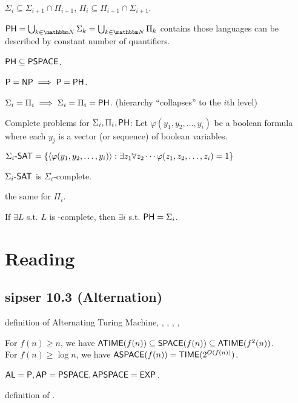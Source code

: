 \documentclass{article}
\begin{document}
\begin{observation}
  \(\Sigma_i \subseteq \Sigma_{i+1} \cap \Pi_{i+1}\), \(\Pi_i \subseteq \Pi_{i+1} \cap \Sigma_{i+1}\).
\end{observation}

\begin{definition}
  \(\PH = \bigcup_{k \in \N} \Sigma_k = \bigcup_{k \in \N} \Pi_k\) contains those languages can be described by constant number of quantifiers.
\end{definition}

\begin{claim}
  \(\text{\sf PH} \subseteq \text{\sf PSPACE}\).
\end{claim}

\begin{theorem}
  \(\text{\sf P} = \text{\sf NP} \implies \text{\sf P} = \text{\sf PH}\).
\end{theorem}

\begin{theorem}
  \(\Sigma_i = \Pi_i \implies \Sigma_i = \Pi_i = \text{\sf PH}\). (hierarchy ``collapses'' to the \(i\)th level)
\end{theorem}

Complete problems for \(\Sigma_i, \Pi_i, \text{\sf PH}\):
Let \(\varphi(y_1, y_2, \ldots, y_i)\) be a boolean formula where each \(y_j\) is a vector (or sequence) of boolean variables.

\begin{definition}
  \(\Sigma_i\text{\sf -SAT} = \lbrace\langle\varphi(y_1, y_2, \ldots, y_i)\rangle : \exists z_1 \forall z_2 \cdots \varphi(z_1, z_2, \ldots, z_i) = 1\rbrace\)
\end{definition}

\begin{exercise}
  \(\Sigma_i\text{\sf -SAT}\) is \(\Sigma_i\)-complete.
\end{exercise}

the same for \(\Pi_i\).

\begin{claim}
  If \(\exists L\) s.t. \(L\) is \PH-complete, then \(\exists i\) s.t. \(\text{\sf PH} = \Sigma_i\).
\end{claim}

\section{Reading}

\subsection{sipser 10.3 (Alternation)}

definition of Alternating Turing Machine, \ATIME, \ASPACE, \AP, \APSPACE, \AL

\begin{theorem}
  For \(f(n) \geq n\), we have \(\text{\sf ATIME}(f(n)) \subseteq \text{\sf SPACE}(f(n)) \subseteq \text{\sf ATIME}(f^2(n))\). \\
  For \(f(n) \geq \log n\), we have \(\text{\sf ASPACE}(f(n)) = \text{\sf TIME}(2^{O(f(n))})\).
\end{theorem}

\begin{corollary}
  \(\text{\sf AL} = \text{\sf P}, \text{\sf AP} = \text{\sf PSPACE}, \text{\sf APSPACE} = \text{\sf EXP}\).
\end{corollary}

definition of \PH.
\end{document}
